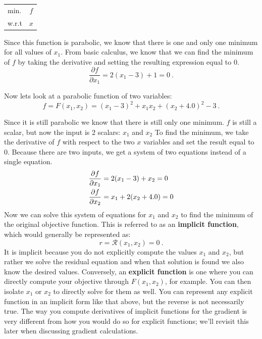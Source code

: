 \documentclass[conf]{new-aiaa}
\begin{document}
    \begin{table}[H]
        \centering
        \begin{tabular}{lc}
            \hline
            min. & $f$ \\
            w.r.t & $x$ \\ \hline
        \end{tabular}
    \end{table}


    Since this function is parabolic, we know that there is one and only one minimum for all values of $x_1$. 
    From basic calculus, we know that we can find the minimum of $f$ by taking the derivative and setting the resulting expression equal to 0. 
    \begin{equation}
        \frac{\partial f}{\partial x_1} = 2(x_1 - 3) + 1 = 0 \ . 
    \end{equation}

    Now lets look at a parabolic function of two variables: 
    \begin{equation}
        f = F(x_1,x_2) = (x_1 - 3)^2 + x_1 x_2 + (x_2 + 4.0)^2 - 3 \ . 
    \end{equation}

    Since it is still parabolic we know that there is still only one minimum. 
    $f$ is still a scalar, but now the input is 2 scalars: $x_1$ and $x_2$
    To find the minimum, we take the derivative of $f$ with respect to the two $x$ variables and set the result equal to 0. 
    Because there are two inputs, we get a system of two equations instead of a single equation. 
    \begin{align}
        \frac{\partial f}{\partial x_1} &= 2(x_1 - 3) + x_2 = 0 \notag \\
        \frac{\partial f}{\partial x_2} &= x_1 + 2(x_2 + 4.0) = 0 \label{eq:linear_deriv}
    \end{align}
    Now we can solve this system of equations for $x_1$ and $x_2$ to find the minimum of the original objective function. 
    This is referred to as an \textbf{implicit function}, which would generally be represented as: 
    \begin{equation} 
    r = \mathcal{R}(x_1, x_2) = 0 \ . 
    \end{equation}
    It is implicit because you do not explicitly compute the values $x_1$ and $x_2$, but rather we solve the residual equation and when that solution is found we also know the desired values. 
    Conversely, an \textbf{explicit function} is one where you can directly compute your objective through $F(x_1, x_2)$, for example. 
    You can then isolate $x_1$ or $x_2$ to directly solve for them as well. 
    You can represent any explicit function in an implicit form like that above, but the reverse is not necessarily true.
    The way you compute derivatives of implicit functions for the gradient is very different from how you would do so for explicit functions; we'll revisit this later when discussing gradient calculations.
\end{document}
